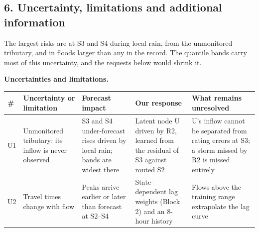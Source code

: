 \documentclass[11pt]{article}
\newcounter{none} %
\begin{document}
\subsection*{6. Uncertainty, limitations and additional information}

The largest risks are at S3 and S4 during local rain, from the unmonitored tributary, and in floods larger than any in the record. The quantile bands carry most of this uncertainty, and the requests below would shrink it.

\textbf{Uncertainties and limitations.}

{\def\LTcaptype{none} %
\begin{longtable}[]{@{}
  >{\raggedright\arraybackslash}p{}
  >{\raggedright\arraybackslash}p{}
  >{\raggedright\arraybackslash}p{}
  >{\raggedright\arraybackslash}p{}
  >{\raggedright\arraybackslash}p{}@{}}
\toprule\noalign{}
\begin{minipage}[b]{\linewidth}\raggedright
\#
\end{minipage} & \begin{minipage}[b]{\linewidth}\raggedright
Uncertainty or limitation
\end{minipage} & \begin{minipage}[b]{\linewidth}\raggedright
Forecast impact
\end{minipage} & \begin{minipage}[b]{\linewidth}\raggedright
Our response
\end{minipage} & \begin{minipage}[b]{\linewidth}\raggedright
What remains unresolved
\end{minipage} \\
\midrule\noalign{}
\endhead
\bottomrule\noalign{}
\endlastfoot
U1 & Unmonitored tributary: its inflow is never observed & S3 and S4 under-forecast rises driven by local rain; bands are widest there & Latent node U driven by R2, learned from the residual of S3 against routed S2 & U's inflow cannot be separated from rating errors at S3; a storm missed by R2 is missed entirely \\
U2 & Travel times change with flow & Peaks arrive earlier or later than forecast at S2--S4 & State-dependent lag weights (Block 2) and an 8-hour history & Flows above the training range extrapolate the lag curve \\

\end{longtable}}
\end{document}
